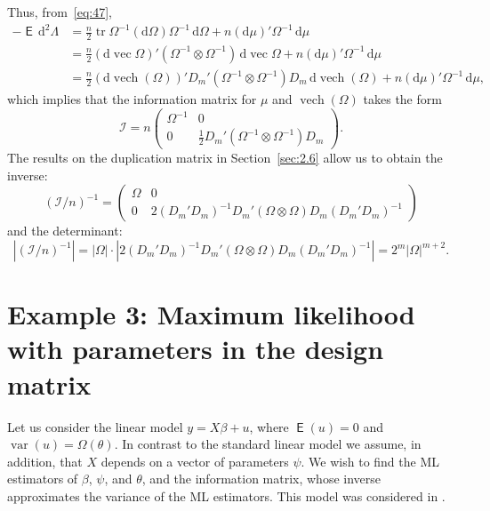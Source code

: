 \documentclass[12pt,a4paper]{article}
\theoremstyle{definition}
\DeclareMathOperator\expc{\mathsf{E}}
\DeclareMathOperator\var{var}
\DeclareMathOperator{\tr}{tr}
\DeclareMathOperator{\vech}{vech}
\DeclareMathOperator{\avec}{vec}
\newcommand{\dd}{\mathrm{d}}
\begin{document}
Thus, from~\eqref{eq:47},
\begin{align*}
-\expc\, \dd^2\Lambda &= \frac{n}{2}\tr\Omega^{-1}(\dd\Omega)\Omega^{-1}\, \dd\Omega + n(\dd\mu)'\Omega^{-1}\, \dd\mu \\
&= \frac{n}{2}(\dd\avec\Omega)'(\Omega^{-1} \otimes \Omega^{-1})\, \dd\avec\Omega + n(\dd\mu)'\Omega^{-1}\, \dd\mu \\
&= \frac{n}{2}(\dd\vech(\Omega))' D_m'(\Omega^{-1} \otimes \Omega^{-1})D_m\, \dd\vech(\Omega) + n(\dd\mu)'\Omega^{-1}\, \dd\mu,
\end{align*}
which implies that the information matrix for $\mu$ and $\vech(\Omega)$ takes the form
\begin{equation}\label{eq:48}
\mathcal{I} = n \begin{pmatrix} \Omega^{-1} & 0 \\ 0 & \frac{1}{2}D_m'(\Omega^{-1} \otimes \Omega^{-1})D_m \end{pmatrix}.
\end{equation}
The results on the duplication matrix in Section~\ref{sec:2.6} allow us to obtain the inverse:
\[
(\mathcal{I}/n)^{-1} = \begin{pmatrix} \Omega & 0 \\ 0 & 2(D_m'D_m)^{-1}D_m'(\Omega \otimes \Omega)D_m(D_m'D_m)^{-1} \end{pmatrix}
\]
and the determinant:
\[
|(\mathcal{I}/n)^{-1}| = |\Omega| \cdot |2(D_m'D_m)^{-1}D_m'(\Omega \otimes \Omega)D_m(D_m'D_m)^{-1}| = 2^m |\Omega|^{m+2}.
\]

\section{Example 3: Maximum likelihood with parameters in the design matrix}\label{sec:14}

Let us consider the linear model $y = X\beta + u$, where $\expc(u) = 0$ and $\var(u) = \Omega(\theta)$. In contrast to the standard linear model we assume, in addition, that $X$ depends on a vector of parameters $\psi$. We wish to find the ML estimators of $\beta$, $\psi$, and $\theta$, and the information matrix, whose inverse approximates the variance of the ML estimators. This model was considered in \cite{Ikefuji2022}. %
\end{document}
